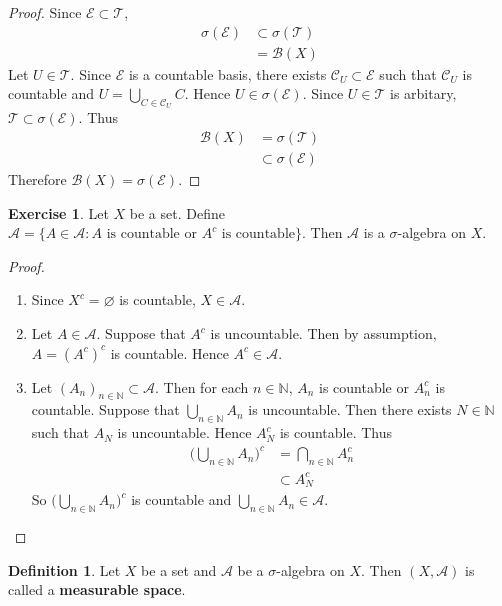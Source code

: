 \documentclass[12pt]{amsart}
\theoremstyle{definition}
\newtheorem{defn}[definition]{Definition}
\newtheorem{ex}[definition]{Exercise}
\newcommand{\sig}{\sigma}
\newcommand{\N}{\mathbb{N}}
\newcommand{\MA}{\mathcal{A}}
\newcommand{\MC}{\mathcal{C}}
\newcommand{\MB}{\mathcal{B}}
\newcommand{\ME}{\mathcal{E}}
\newcommand{\MT}{\mathcal{T}}
\newcommand{\lex}[1]{\label{ex:#1}}
\newcommand{\ld}[1]{\label{defn:#1}}
\begin{document}
	\begin{proof}
		Since $\ME \subset \MT$, 
		\begin{align*}
			\sig(\ME)
			& \subset \sig(\MT) \\
			& = \MB(X)
		\end{align*}
		Let $U \in \MT$. Since $\ME$ is a countable basis, there exists $\MC_U \subset \ME$ such that $\MC_U$ is countable and $U = \bigcup\limits_{C \in \MC_U}C$. Hence $U \in \sig(\ME)$. Since $U \in \MT$ is arbitary, $\MT \subset \sig(\ME)$. Thus 
		\begin{align*}
			\MB(X) 
			& = \sig(\MT) \\
			& \subset \sig(\ME)
		\end{align*} 
		Therefore $\MB(X) = \sig(\ME)$.
	\end{proof}
	
	\begin{ex} \lex{00000} 
		Let $X$ be a set. Define $\MA = \{A \in \MA: A \text{ is countable or }A^c  \text{ is countable}\}$. Then $\MA$ is a $\sig$-algebra on $X$.
	\end{ex}
	
	\begin{proof}\
		\begin{enumerate}
			\item Since $X^c = \varnothing$ is countable, $X \in \MA$.
			\item Let $A \in \MA$. Suppose that $A^c$ is  uncountable. Then by assumption, $A = (A^c)^c$ is countable. Hence $A^c \in \MA$.
			\item Let $(A_n)_{n \in \N} \subset \MA$. Then for each $n \in \N$, $A_n$ is countable or $A_n^c$ is countable. Suppose that $\bigcup\limits_{n \in \N}A_n$ is uncountable. Then there exists $N \in \N$ such that $A_N$ is uncountable. Hence $A_N^c$ is countable. Thus 
			\begin{align*}
				\bigg(\bigcup_{n \in \N}A_n \bigg)^c 
				&= \bigcap_{n \in \N}A_n^c \\
				& \subset A_N^c 
			\end{align*}
			So $\bigg(\bigcup\limits_{n \in \N}A_n \bigg)^c $ is countable and $\bigcup\limits_{n \in \N}A_n \in \MA$. 
		\end{enumerate}
	\end{proof}


	\begin{defn} \ld{00000} 
		Let $X$ be a set and $\MA$ be a $\sig$-algebra on $X$. Then $(X, \MA)$ is called a \textbf{measurable space}.
	\end{defn}
\end{document}
